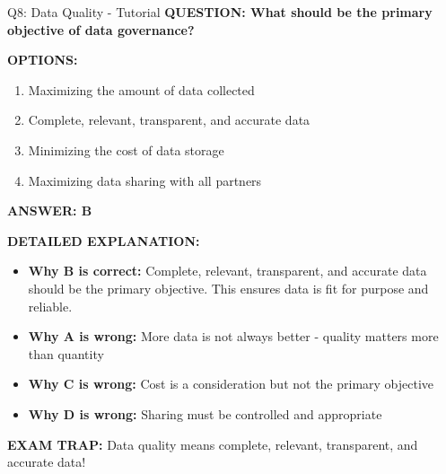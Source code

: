 \documentclass[8pt]{beamer}
\begin{document}
	\begin{frame}{Q8: Data Quality - Tutorial}
		\fontsize{6.5}{7.5}\selectfont
		\textbf{QUESTION: What should be the primary objective of data governance?}
		
		\vspace{0.1cm}
		\textbf{OPTIONS:}
		\begin{enumerate}
			\item Maximizing the amount of data collected
			\item Complete, relevant, transparent, and accurate data
			\item Minimizing the cost of data storage
			\item Maximizing data sharing with all partners
		\end{enumerate}
		
		\vspace{0.1cm}
		\textcolor{myblue}{\textbf{ANSWER: B}}
		
		\vspace{0.1cm}
		\textbf{DETAILED EXPLANATION:}
		\begin{itemize}
			\item \textbf{Why B is correct:} Complete, relevant, transparent, and accurate data should be the primary objective. This ensures data is fit for purpose and reliable.
			\item \textbf{Why A is wrong:} More data is not always better - quality matters more than quantity
			\item \textbf{Why C is wrong:} Cost is a consideration but not the primary objective
			\item \textbf{Why D is wrong:} Sharing must be controlled and appropriate
		\end{itemize}
		
		\textcolor{myred}{\textbf{EXAM TRAP:}} Data quality means \textcolor{myblue}{complete, relevant, transparent, and accurate} data!
	\end{frame}
	
\end{document}
